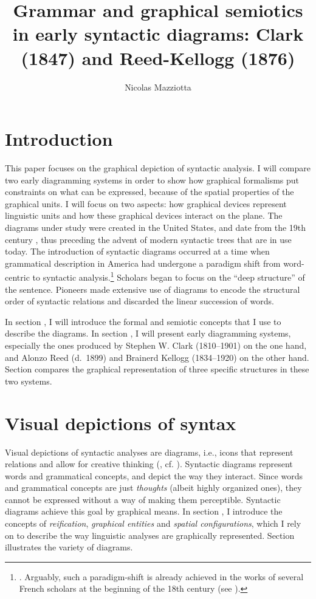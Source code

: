 \documentclass[english,output=paper,colorlinks,citecolor=brown]{../langscibook}
\author{Nicolas Mazziotta\affiliation{Université de Liège}}
\title{Grammar and graphical semiotics in early syntactic diagrams: Clark (1847) and Reed-Kellogg (1876)}
\begin{document}
\maketitle

\section{Introduction}\label{sec:4:1}

This paper focuses on the graphical depiction of syntactic analysis. I will compare two early dia\-gramming systems in order to show how graphical formalisms put constraints on what can be expressed, because of the spatial properties of the graphical units. I will focus on two aspects: how graphical devices represent linguistic units and how these graphical devices interact on the plane. The diagrams under study were created in the United States, and date from the 19th century \citep{Brittain1973}, thus preceding the advent of modern syntactic trees that are in use today. The introduction of syntactic diagrams occurred at a time when grammatical description in America had undergone a paradigm shift from word-centric to syntactic analysis.\footnote{\citet[76]{AartsMcMahon2006}. Arguably, such a paradigm-shift is already achieved in the works of several French scholars at the beginning of the 18th century (see \citealt{ImrenyiMazziotta2020}).} Scholars began to focus on the “deep structure” of the sentence. Pioneers made extensive use of diagrams to encode the structural order of syntactic relations and discarded the linear succession of words. 

In section , I will introduce the formal and semiotic concepts that I use to describe the diagrams. In section , I will present early dia\-gramming systems, especially the ones produced by Stephen W. Clark (1810–1901) on the one hand, and Alonzo Reed (d.~1899) and Brainerd Kellogg (1834–1920) on the other hand. Section  compares the graphical representation of three specific structures in these two systems.

\section{Visual depictions of syntax}\label{sec:4:2}

Visual depictions of syntactic analyses are diagrams, i.e., icons that represent relations and allow for creative thinking (\citealt{Peirce1994}, cf. \citealt[36--42]{Chauvire2008}). Syntactic diagrams represent words and grammatical concepts, and depict the way they interact. Since words and grammatical concepts are just \textit{thoughts} (albeit highly organized ones), they cannot be expressed without a way of making them perceptible. Syntactic diagrams achieve this goal by graphical means. In section , I introduce the concepts of \textit{reification}, \textit{graphical entities} and \textit{spatial configurations}, which I rely on to describe the way linguistic analyses are graphically represented. Section  illustrates the variety of diagrams. 
\end{document}
